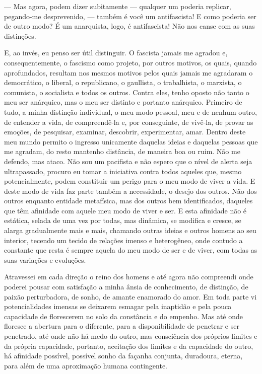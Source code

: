--- Mas agora, podem dizer subitamente --- qualquer um poderia replicar,
pegando-me desprevenido, --- também é você um antifascista! E como
poderia ser de outro modo? É um anarquista, logo, é antifascista! Não
nos canse com as suas distinções.

E, ao invés, eu penso ser útil distinguir. O fascista jamais me agradou
e, consequentemente, o fascismo como projeto, por outros motivos, os
quais, quando aprofundados, resultam nos mesmos motivos pelos quais
jamais me agradaram o democrático, o liberal, o republicano, o
gaullista, o trabalhista, o marxista, o comunista, o socialista e todos
os outros. Contra eles, tenho oposto não tanto o meu ser anárquico, mas
o meu ser distinto e portanto anárquico. Primeiro de tudo, a minha
distinção individual, o meu modo pessoal, meu e de nenhum outro, de
entender a vida, de compreendê-la e, por conseguinte, de vivê-la, de
provar as emoções, de pesquisar, examinar, descobrir, experimentar,
amar. Dentro deste meu mundo permito o ingresso unicamente daquelas
ideias e daquelas pessoas que me agradam, do resto mantenho distância,
de maneira boa ou ruim. Não me defendo, mas ataco. Não sou um pacifista
e não espero que o nível de alerta seja ultrapassado, procuro eu tomar a
iniciativa contra todos aqueles que, mesmo potencialmente, podem
constituir um perigo para o meu modo de viver a vida. E deste modo de
vida faz parte também a necessidade, o desejo dos outros. Não dos outros
enquanto entidade metafísica, mas dos outros bem identificados, daqueles
que têm afinidade com aquele meu modo de viver e ser. E esta afinidade
não é estática, selada de uma vez por todas, mas dinâmica, se modifica e
cresce, se alarga gradualmente mais e mais, chamando outras ideias e
outros homens ao seu interior, tecendo um tecido de relações imenso e
heterogêneo, onde contudo a constante que resta é sempre aquela do meu
modo de ser e de viver, com todas as suas variações e evoluções.

Atravessei em cada direção o reino dos homens e até agora não compreendi
onde poderei pousar com satisfação a minha ânsia de conhecimento, de
distinção, de paixão perturbadora, de sonho, de amante enamorado do
amor. Em toda parte vi potencialidades imensas se deixarem esmagar pela
inaptidão e pela pouca capacidade de florescerem no solo da constância e
do empenho. Mas até onde floresce a abertura para o diferente, para a
disponibilidade de penetrar e ser penetrado, até onde não há medo do
outro, mas consciência dos próprios limites e da própria capacidade,
portanto, aceitação dos limites e da capacidade do outro, há afinidade
possível, possível sonho da façanha conjunta, duradoura, eterna, para
além de uma aproximação humana contingente.

